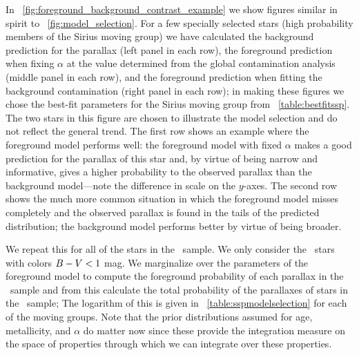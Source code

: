 In \figurename~\ref{fig:foreground_background_contrast_example} we
show figures similar in spirit to
\figurename~\ref{fig:model_selection}. For a few specially selected
stars (high probability members of the Sirius moving group) we have
calculated the background prediction for the parallax (left panel in
each row), the foreground prediction when fixing $\alpha$ at the value
determined from the global contamination analysis (middle panel in
each row), and the foreground prediction when fitting the background
contamination (right panel in each row); in making these figures we
chose the best-fit parameters for the Sirius moving group from
\tablename~\ref{table:bestfitssp}. The two stars in this figure are
chosen to illustrate the model selection and do not reflect the
general trend. The first row shows an example where the foreground
model performs well: the foreground model with fixed $\alpha$ makes a
good prediction for the parallax of this star and, by virtue of being
narrow and informative, gives a higher probability to the observed
parallax than the background model---note the difference in scale on
the $y$-axes. The second row shows the much more common situation in
which the foreground model misses completely and the observed parallax
is found in the tails of the predicted distribution; the background
model performs better by virtue of being broader.

We repeat this for all of the stars in the \gcsabb\ sample. We only
consider the \ngcsstarscolorcutSSP\ stars with colors $B-V < 1$
mag. We marginalize over the parameters of the foreground model to
compute the foreground probability of each parallax in the
\gcsabb\ sample and from this calculate the total probability of the
parallaxes of stars in the \gcsabb\ sample; The logarithm of this is
given in \tablename~\ref{table:sspmodelselection} for each of the
moving groups. Note that the prior distributions assumed for age,
metallicity, and $\alpha$ do matter now since these provide the
integration measure on the space of properties through which we can
integrate over these properties.

